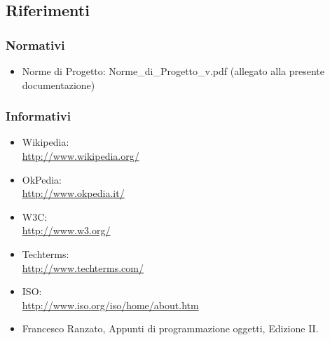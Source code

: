 \subsection{Riferimenti} %
\label{1.4}
\subsubsection{Normativi} %
\label{1.4.1}
\begin{itemize}
\item Norme di Progetto: Norme\_{}di\_{}Progetto\_{}v\versioneNormeProgetto{}.pdf  (allegato alla presente documentazione)\\
\end{itemize}
\subsubsection{Informativi} %
\label{1.4.2}
\begin{itemize}
\item Wikipedia:\\ \url{ http://www.wikipedia.org/}
\item OkPedia:\\ \url{ http://www.okpedia.it/}
\item W3C:\\ \url{http://www.w3.org/}
\item Techterms:\\ \url{http://www.techterms.com/}
\item ISO:\\ \url{http://www.iso.org/iso/home/about.htm}
\item Francesco Ranzato, Appunti di programmazione oggetti, Edizione II.\\
\end{itemize}

\newpage
\Inizio{} %
\begin{flushright}
\Lettera{\#}  %
\end{flushright}







